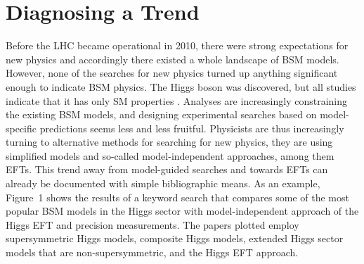 \section{Diagnosing a Trend} \label{sec:data}
Before the LHC became operational in 2010, there were strong expectations for new physics and accordingly there existed a whole landscape of BSM models. 
However, none of the searches for new physics turned up anything significant enough to indicate BSM physics.
The Higgs boson was discovered, but all studies indicate that it has only SM properties \citep[see][for a detailed discussion of the discovery]{challetal1}.
Analyses are increasingly constraining the existing BSM models, and designing experimental searches based on model-specific predictions seems less and less fruitful. 
Physicists are thus increasingly turning to alternative methods for searching for new physics, they are using simplified models and so-called model-independent approaches, among them EFTs.
This trend away from model-guided searches and towards EFTs can already be documented with simple bibliographic means.
As an example, Figure~1 shows the results of a keyword search that compares some of the most popular BSM models in the Higgs sector with model-independent approach of the Higgs EFT and precision measurements.  
The papers plotted employ supersymmetric Higgs models, composite Higgs models, extended Higgs sector models that are non-supersymmetric, and the Higgs EFT approach. 

